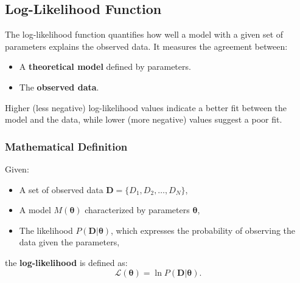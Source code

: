 \documentclass[12pt]{article}
\begin{document}

  
\subsection*{Log-Likelihood Function}
The log-likelihood function quantifies how well a model with a given set of parameters explains the observed data. It measures the agreement between:
\begin{itemize}
    \item A \textbf{theoretical model} defined by parameters.
    \item The \textbf{observed data}.
\end{itemize}

Higher (less negative) log-likelihood values indicate a better fit between the model and the data, while lower (more negative) values suggest a poor fit.

\subsubsection*{Mathematical Definition}
Given:
\begin{itemize}
    \item A set of observed data $\mathbf{D} = \{D_1, D_2, \dots, D_N\}$,
    \item A model $M(\boldsymbol{\theta})$ characterized by parameters $\boldsymbol{\theta}$,
    \item The likelihood $P(\mathbf{D} | \boldsymbol{\theta})$, which expresses the probability of observing the data given the parameters,
\end{itemize}
the \textbf{log-likelihood} is defined as:
\begin{equation}
    \mathcal{L}(\boldsymbol{\theta}) = \ln P(\mathbf{D} | \boldsymbol{\theta}).
\end{equation}
\end{document}
